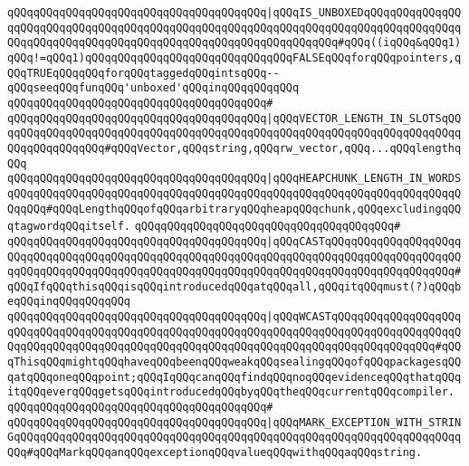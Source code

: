 \verb|qQQqqQQqqQQqqQQqqQQqqQQqqQQqqQQqqQQqqQQq|\verb#|qQQqIS_UNBOXEDqQQqqQQqqQQqqQQqqQQqqQQqqQQqqQQqqQQqqQQqqQQqqQQqqQQqqQQqqQQqqQQqqQQqqQQqqQQqqQQqqQQqqQQqqQQqqQQqqQQqqQQqqQQqqQQqqQQqqQQqqQQqqQQqqQQqqQQq#\verb|#qQQq((iqQQq&qQQq1)qQQq!=qQQq1)qQQqqQQqqQQqqQQqqQQqqQQqqQQqqQQqFALSEqQQqforqQQqpointers,qQQqTRUEqQQqqQQqforqQQqtaggedqQQqintsqQQq--qQQqseeqQQqfunqQQq'unboxed'qQQqinqQQqqQQqqQQq|\newline
\verb|qQQqqQQqqQQqqQQqqQQqqQQqqQQqqQQqqQQqqQQq#|\newline
\verb|qQQqqQQqqQQqqQQqqQQqqQQqqQQqqQQqqQQqqQQq|\verb#|qQQqVECTOR_LENGTH_IN_SLOTSqQQqqQQqqQQqqQQqqQQqqQQqqQQqqQQqqQQqqQQqqQQqqQQqqQQqqQQqqQQqqQQqqQQqqQQqqQQqqQQqqQQqqQQq#\verb|#qQQqVector,qQQqstring,qQQqrw_vector,qQQq...qQQqlengthqQQq|\newline
\verb|qQQqqQQqqQQqqQQqqQQqqQQqqQQqqQQqqQQqqQQq|\verb#|qQQqHEAPCHUNK_LENGTH_IN_WORDSqQQqqQQqqQQqqQQqqQQqqQQqqQQqqQQqqQQqqQQqqQQqqQQqqQQqqQQqqQQqqQQqqQQqqQQqqQQq#\verb|#qQQqLengthqQQqofqQQqarbitraryqQQqheapqQQqchunk,qQQqexcludingqQQqtagwordqQQqitself.|\newline
\verb|qQQqqQQqqQQqqQQqqQQqqQQqqQQqqQQqqQQqqQQq#|\newline
\verb|qQQqqQQqqQQqqQQqqQQqqQQqqQQqqQQqqQQqqQQq|\verb#|qQQqCASTqQQqqQQqqQQqqQQqqQQqqQQqqQQqqQQqqQQqqQQqqQQqqQQqqQQqqQQqqQQqqQQqqQQqqQQqqQQqqQQqqQQqqQQqqQQqqQQqqQQqqQQqqQQqqQQqqQQqqQQqqQQqqQQqqQQqqQQqqQQqqQQqqQQqqQQqqQQqqQQq#\verb|#qQQqIfqQQqthisqQQqisqQQqintroducedqQQqatqQQqall,qQQqitqQQqmust(?)qQQqbeqQQqinqQQqqQQqqQQq|\newline
\verb|qQQqqQQqqQQqqQQqqQQqqQQqqQQqqQQqqQQqqQQq|\verb#|qQQqWCASTqQQqqQQqqQQqqQQqqQQqqQQqqQQqqQQqqQQqqQQqqQQqqQQqqQQqqQQqqQQqqQQqqQQqqQQqqQQqqQQqqQQqqQQqqQQqqQQqqQQqqQQqqQQqqQQqqQQqqQQqqQQqqQQqqQQqqQQqqQQqqQQqqQQqqQQqqQQq#\verb|#qQQqThisqQQqmightqQQqhaveqQQqbeenqQQqweakqQQqsealingqQQqofqQQqpackagesqQQqatqQQqoneqQQqpoint;qQQqIqQQqcanqQQqfindqQQqnoqQQqevidenceqQQqthatqQQqitqQQqeverqQQqgetsqQQqintroducedqQQqbyqQQqtheqQQqcurrentqQQqcompiler.|\newline
\verb|qQQqqQQqqQQqqQQqqQQqqQQqqQQqqQQqqQQqqQQq#|\newline
\verb|qQQqqQQqqQQqqQQqqQQqqQQqqQQqqQQqqQQqqQQq|\verb#|qQQqMARK_EXCEPTION_WITH_STRINGqQQqqQQqqQQqqQQqqQQqqQQqqQQqqQQqqQQqqQQqqQQqqQQqqQQqqQQqqQQqqQQqqQQqqQQq#\verb|#qQQqMarkqQQqanqQQqexceptionqQQqvalueqQQqwithqQQqaqQQqstring.|\newline
